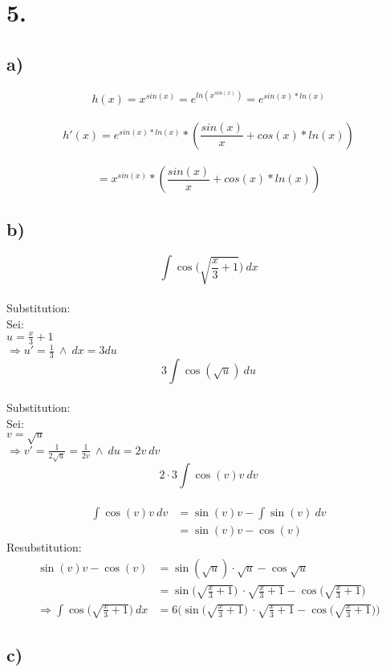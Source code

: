 \documentclass[a4paper]{scrartcl}
\begin{document}
\newpage
\section{5.}
\subsection{a)}
\[h(x) = x^{sin(x)} = e^{ln(x^{sin(x)})} = e^{sin(x)*ln(x)}\] \\
\[h'(x) = e^{sin(x)*ln(x)} * (\frac{sin(x)}{x} + cos(x) * ln(x))\] \\
\[ = x^{sin(x)} * (\frac{sin(x)}{x} + cos(x) * ln(x))\]
\subsection{b)}
\[\int\cos\Big(\sqrt{\frac{x}{3}+1}\Big)\ dx\]\\
Substitution:\\
Sei:\\
\(u=\frac{x}{3}+1\)\\
\(\Rightarrow u'=\frac{1}{3}\ \land \ dx=3du\)\\
\[3\int\cos(\sqrt{u})\ du\]\\
Substitution:\\
Sei:\\
\(v=\sqrt{u}\)\\
\(\Rightarrow v'=\frac{1}{2\sqrt{u}}=\frac{1}{2v}\ \land \ du=2v\ dv\)\\
\[2\cdot 3\int\cos(v)v\ dv\]\\
\begin{align}
\int\cos(v)v\ dv&=\sin(v)v-\int\sin(v)\ dv\\
	&=\sin(v)v-\cos(v)
\end{align}
Resubstitution:
\begin{align}
\sin(v)v-\cos(v)&=\sin(\sqrt{u})\cdot\sqrt{u}-\cos\sqrt{u}\\
	&=\sin\Big(\sqrt{\frac{x}{3}+1}\Big)\ \cdot\sqrt{\frac{x}{3}+1}-\cos\Big(\sqrt{\frac{x}{3}+1}\Big)\\
	\Rightarrow \int\cos\Big(\sqrt{\frac{x}{3}+1}\Big)\ dx &=6\Bigg(\sin\Big(\sqrt{\frac{x}{3}+1}\Big)\ \cdot\sqrt{\frac{x}{3}+1}-\cos\Big(\sqrt{\frac{x}{3}+1}\Big)\Bigg)
\end{align}
\subsection{c)}
\end{document}
